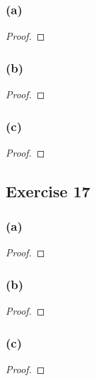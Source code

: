 \documentclass[14pt]{extarticle}
\begin{document}
\subsubsection{(a)}

\begin{proof}

\end{proof}

\subsubsection{(b)}

\begin{proof}

\end{proof}

\subsubsection{(c)}

\begin{proof}

\end{proof}

\subsection{Exercise 17}
\subsubsection{(a)}

\begin{proof}

\end{proof}

\subsubsection{(b)}

\begin{proof}

\end{proof}

\subsubsection{(c)}

\begin{proof}

\end{proof}
\end{document}
